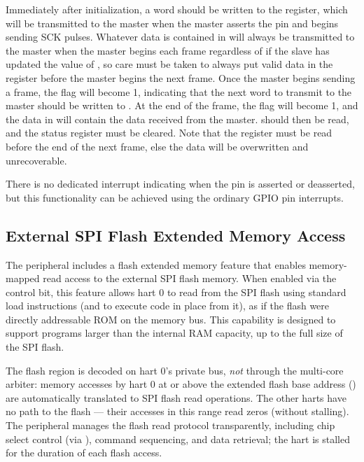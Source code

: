 Immediately after initialization, a word should be written to the  register, which will be transmitted to the master when the master asserts the  pin and begins sending SCK pulses. Whatever data is contained in  will always be transmitted to the master when the master begins each frame regardless of if the slave has updated the value of , so care must be taken to always put valid data in the  register before the master begins the next frame. Once the master begins sending a frame, the  flag will become 1, indicating that the next word to transmit to the master should be written to . At the end of the frame, the  flag will become 1, and the data in  will contain the data received from the master.  should then be read, and the status register  must be cleared. Note that the  register must be read before the end of the next frame, else the data will be overwritten and unrecoverable.

There is no dedicated interrupt indicating when the  pin is asserted or deasserted, but this functionality can be achieved using the ordinary GPIO pin interrupts.



\subsection{External SPI Flash Extended Memory Access} \label{ss:spi-flash-xip}

The  peripheral includes a flash extended memory feature that enables memory-mapped read access to the external SPI flash memory. When enabled via the  control bit, this feature allows hart 0 to read from the SPI flash using standard load instructions (and to execute code in place from it), as if the flash were directly addressable ROM on the memory bus. This capability is designed to support programs larger than the internal RAM capacity, up to the full size of the SPI flash.

The flash region is decoded on hart 0's private bus, \textit{not} through the multi-core arbiter: memory accesses by hart 0 at or above the extended flash base address (\texttt{\FlashBaseAddress}) are automatically translated to SPI flash read operations. The other harts have no path to the flash --- their accesses in this range read zeros (without stalling). The  peripheral manages the flash read protocol transparently, including chip select control (via ), command sequencing, and data retrieval; the hart is stalled for the duration of each flash access.

